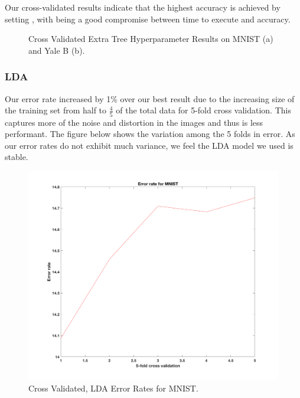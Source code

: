 Our cross-validated results indicate that the highest accuracy is achieved by setting , with  being a good compromise between time to execute and accuracy.
%
\begin{figure}[H]
    \centering
    \caption{Cross Validated Extra Tree Hyperparameter Results on MNIST (a) and Yale B (b).}
\end{figure}

\subsubsection{LDA}
Our error rate increased by 1\% over our best result due to the increasing size of the training set from half to $\frac{4}{5}$ of the total data for 5-fold cross validation. This captures more of the noise and distortion in the images and thus is less performant. The figure below shows the variation among the 5 folds in error. As our error rates do not exhibit much variance, we feel the LDA model we used is stable.
%
\begin{figure}[H]
	\centering\includegraphics[width=0.6\columnwidth]{../images/cr-err-mnist}
	\caption{Cross Validated, LDA Error Rates for MNIST.}
\end{figure}

